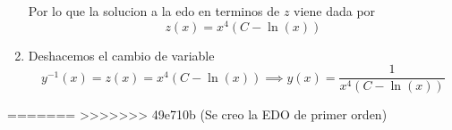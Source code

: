 \documentclass[a4paper,oneside,10.5pt]{article}
\begin{document}
\begin{enumerate}
        Por lo que la solucion a la edo en terminos de $z$ viene dada por
        \begin{equation*}
          z(x) = x^{4}(C - \ln(x))
        \end{equation*}

  \item Deshacemos el cambio de variable
        \begin{equation*}
          y^{-1}(x) = z(x) = x^{4}(C - \ln(x)) \implies y(x) = \frac{1}{x^{4}(C - \ln(x))}
        \end{equation*}




\end{enumerate}

=======
>>>>>>> 49e710b (Se creo la EDO de primer orden)
\end{document}
